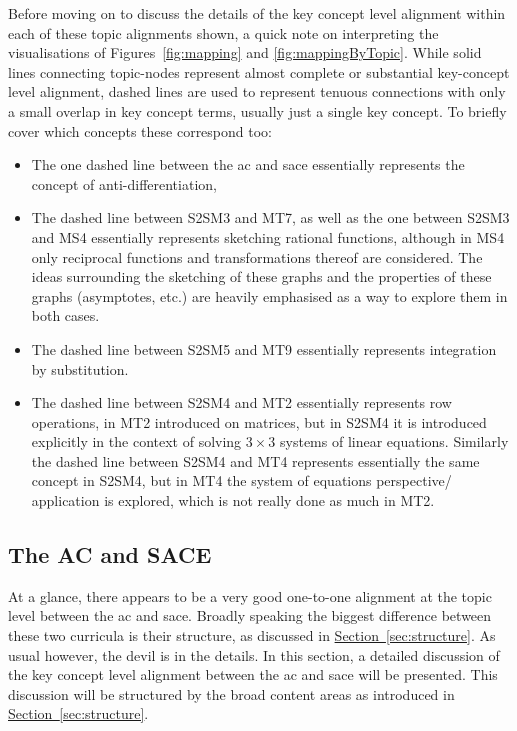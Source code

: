 \documentclass[twoside,12pt,a4paper]{report}
\newcommand{\refsec}[1]{\hyperref[sec:#1]{Section~\ref{sec:#1}}}
\begin{document}
Before moving on to discuss the details of the key concept level alignment within each of these topic alignments shown, a quick note on interpreting the visualisations of Figures~\ref{fig:mapping} and \ref{fig:mappingByTopic}. While solid lines connecting topic-nodes represent almost complete or substantial key-concept level alignment, dashed lines are used to represent tenuous connections with only a small overlap in key concept terms, usually just a single key concept. To briefly cover which concepts these correspond too:
\begin{itemize}
	\item The one dashed line between the \gls{ac} and \gls{sace} essentially represents the concept of anti-differentiation,
	\item The dashed line between S2SM3 and MT7, as well as the one between S2SM3 and MS4 essentially represents sketching rational functions, although in MS4 only reciprocal functions and transformations thereof are considered. The ideas surrounding the sketching of these graphs and the properties of these graphs (asymptotes, etc.) are heavily emphasised as a way to explore them in both cases.
	\item The dashed line between S2SM5 and MT9 essentially represents integration by substitution.
	\item The dashed line between S2SM4 and MT2 essentially represents row operations, in MT2 introduced on matrices, but in S2SM4 it is introduced explicitly in the context of solving $3 \times 3$ systems of linear equations. Similarly the dashed line between S2SM4 and MT4 represents essentially the same concept in S2SM4, but in MT4 the system of equations perspective/ application is explored, which is not really done as much in MT2.
\end{itemize}



\subsection{The AC and SACE}

At a glance, there appears to be a very good one-to-one alignment at the topic level between the \gls{ac} and \gls{sace}. Broadly speaking the biggest difference between these two curricula is their structure, as discussed in \refsec{structure}. As usual however, the devil is in the details. In this section, a detailed discussion of the key concept level alignment between the \gls{ac} and \gls{sace} will be presented. This discussion will be structured by the broad content areas as introduced in 
\refsec{structure}.
\end{document}
